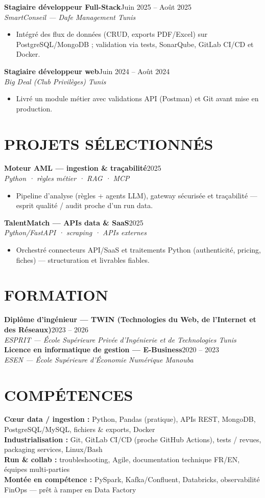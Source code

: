 \documentclass[10pt,a4paper]{article}
\newcommand{\job}[3]{%
  \textbf{\color{primary}#1}\hfill{\color{muted}\small #2}\\[-1pt]
  {\color{accent}\textit{#3}}\\[1pt]
  \begin{itemize}
}
\newcommand{\proj}[3]{%
  \textbf{\color{primary}#1}\hfill{\color{muted}\small #2}\\[-1pt]
  {\color{accent}\textit{#3}}\\[0.5pt]
  \begin{itemize}
}
\newcommand{\edu}[3]{%
  \textbf{\color{primary}#1}\hfill{\color{muted}\small #2}\\[-1pt]
  {\color{accent}\textit{#3}}\\[2pt]
}
\begin{document}
\job{Stagiaire développeur Full-Stack}{Juin 2025 -- Août 2025}{SmartConseil — Dafe Management \textbar{} Tunis}
  \item Intégré des flux de données (CRUD, exports PDF/Excel) sur PostgreSQL/MongoDB ; validation via tests, SonarQube, GitLab CI/CD et Docker.
\end{itemize}

\job{Stagiaire développeur web}{Juin 2024 -- Août 2024}{Big Deal (Club Privilèges) \textbar{} Tunis}
  \item Livré un module métier avec validations API (Postman) et Git avant mise en production.
\end{itemize}

\section{PROJETS SÉLECTIONNÉS}
{\footnotesize
\proj{Moteur AML — ingestion \& traçabilité}{2025}{Python · règles métier · RAG · MCP}
  \item Pipeline d'analyse (règles + agents LLM), gateway sécurisée et traçabilité — esprit qualité / audit proche d'un run data.
\end{itemize}
\proj{TalentMatch — APIs data \& SaaS}{2025}{Python/FastAPI · scraping · APIs externes}
  \item Orchestré connecteurs API/SaaS et traitements Python (authenticité, pricing, fiches) — structuration et livrables fiables.
\end{itemize}
}

\section{FORMATION}
\edu{Diplôme d'ingénieur — TWIN (Technologies du Web, de l'Internet et des Réseaux)}{2023 -- 2026}{ESPRIT — École Supérieure Privée d'Ingénierie et de Technologies \textbar{} Tunis}
\edu{Licence en informatique de gestion — E-Business}{2020 -- 2023}{ESEN — École Supérieure d'Économie Numérique \textbar{} Manouba}

\section{COMPÉTENCES}
{\small
\textbf{\color{primary}Cœur data / ingestion :} Python, Pandas (pratique), APIs REST, MongoDB, PostgreSQL/MySQL, fichiers \& exports, Docker\\[1pt]
\textbf{\color{primary}Industrialisation :} Git, GitLab CI/CD (proche GitHub Actions), tests / revues, packaging services, Linux/Bash\\[1pt]
\textbf{\color{primary}Run \& collab :} troubleshooting, Agile, documentation technique FR/EN, équipes multi-parties\\[1pt]
\textbf{\color{primary}Montée en compétence :} PySpark, Kafka/Confluent, Databricks, observabilité FinOps — prêt à ramper en Data Factory
}
\end{document}
